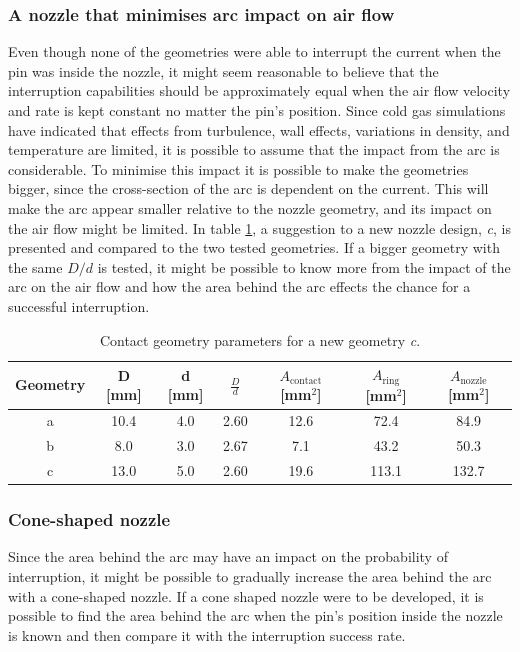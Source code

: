 \documentclass[10pt,a4paper,twoside]{article}
\begin{document}
\subsubsection{A nozzle that minimises arc impact on air flow}
Even though none of the geometries were able to interrupt the current when the pin was inside the nozzle, it might seem reasonable to believe that the interruption capabilities should be approximately equal when the air flow velocity and rate is kept constant no matter the pin's position. Since cold gas simulations have indicated that effects from turbulence, wall effects, variations in density, and temperature are limited, it is possible to assume that the impact from the arc is considerable. To minimise this impact it is possible to make the geometries bigger, since the cross-section of the arc is dependent on the current. This will make the arc appear smaller relative to the nozzle geometry, and its impact on the air flow might be limited. In table \ref{tab:contGeoParaNew}, a suggestion to a new nozzle design, \textit{c}, is presented and compared to the two tested geometries. If a bigger geometry with the same ${D}/{d}$ is tested, it might be possible to know more from the impact of the arc on the air flow and how the area behind the arc effects the chance for a successful interruption.

\begin{table}[H]
\center
\caption{Contact geometry parameters for a new geometry \textit{c}.}
 \begin{tabular}{|c|c|c|c|c|c|c|}
\hline 
Geometry & D [mm] & d [mm] & $\frac{D}{d}$ & $A_\mathrm{{contact}}$ [mm$^2$] & $A_\mathrm{{ring}}$ [mm$^2$] & $A_\mathrm{{nozzle}}$ [mm$^2$] \\ 
\hline 
a & 10.4 & 4.0 & 2.60 & 12.6 & 72.4 & 84.9 \\ 
\hline 
b & 8.0 & 3.0 & 2.67 & 7.1 & 43.2 & 50.3 \\ 
\hline 
c & 13.0 & 5.0 & 2.60 & 19.6 & 113.1 & 132.7 \\ 
\hline
\end{tabular} 
\label{tab:contGeoParaNew}
\end{table}

\subsubsection{Cone-shaped nozzle}
Since the area behind the arc may have an impact on the probability of interruption, it might be possible to gradually increase the area behind the arc with a cone-shaped nozzle. If a cone shaped nozzle were to be developed, it is possible to find the area behind the arc when the pin's position inside the nozzle is known and then compare it with the interruption success rate.
\end{document}
